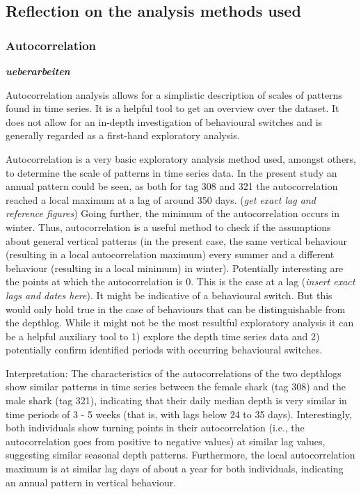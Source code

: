 \documentclass[
  authoryear,
  review,
  3p]{elsarticle}
\begin{document}
\hypertarget{reflection-on-the-analysis-methods-used}{%
\subsection{Reflection on the analysis methods
used}\label{reflection-on-the-analysis-methods-used}}

\hypertarget{autocorrelation}{%
\subsubsection{Autocorrelation}\label{autocorrelation}}

\textbf{\emph{ueberarbeiten}}

Autocorrelation analysis allows for a simplistic description of scales
of patterns found in time series. It is a helpful tool to get an
overview over the dataset. It does not allow for an in-depth
investigation of behavioural switches and is generally regarded as a
first-hand exploratory analysis.

Autocorrelation is a very basic exploratory analysis method used,
amongst others, to determine the scale of patterns in time series data.
In the present study an annual pattern could be seen, as both for tag
308 and 321 the autocorrelation reached a local maximum at a lag of
around 350 days. (\emph{get exact lag and reference figures}) Going
further, the minimum of the autocorrelation occurs in winter. Thus,
autocorrelation is a useful method to check if the assumptions about
general vertical patterns (in the present case, the same vertical
behaviour (resulting in a local autocorrelation maximum) every summer
and a different behaviour (resulting in a local minimum) in winter).
Potentially interesting are the points at which the autocorrelation is
0. This is the case at a lag (\emph{insert exact lags and dates here}).
It might be indicative of a behavioural switch. But this would only hold
true in the case of behaviours that can be distinguishable from the
depthlog. While it might not be the most resultful exploratory analysis
it can be a helpful auxiliary tool to 1) explore the depth time series
data and 2) potentially confirm identified periods with occurring
behavioural switches.

Interpretation: The characteristics of the autocorrelations of the two
depthlogs show similar patterns in time series between the female shark
(tag 308) and the male shark (tag 321), indicating that their daily
median depth is very similar in time periods of 3 - 5 weeks (that is,
with lags below 24 to 35 days). Interestingly, both individuals show
turning points in their autocorrelation (i.e., the autocorrelation goes
from positive to negative values) at similar lag values, suggesting
similar seasonal depth patterns. Furthermore, the local autocorrelation
maximum is at similar lag days of about a year for both individuals,
indicating an annual pattern in vertical behaviour.
\end{document}
